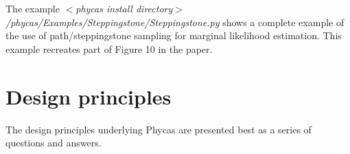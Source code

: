 \documentclass[10pt]{article}
\newcommand{\pathname}[1]{{\em #1}}				%
\begin{document}
The example \pathname{$<$phycas install directory$>$/phycas/Examples/Steppingstone/Steppingstone.py} shows a complete example of the use of path/steppingstone sampling for marginal likelihood estimation. This example recreates part of Figure 10 in the \citet{XieLewisFanKuoChen2009} paper.

\section{Design principles}\label{sec:designprinciples}

The design principles underlying Phycas are presented best as a series of questions and answers.

\end{document}
